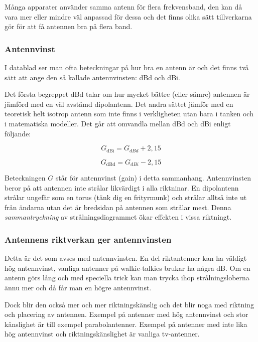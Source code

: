 Många apparater använder samma antenn för flera frekvensband, den kan då vara mer eller mindre väl anpassad för dessa och det finns olika sätt tillverkarna gör för att få antennen bra på flera band.

\subsubsection{Antennvinst}

I datablad ser man ofta beteckningar på hur bra en antenn är och det finns två sätt att ange den så kallade antennvinsten: dBd och dBi.

Det första begreppet dBd talar om hur mycket bättre (eller sämre) antennen är jämförd med en väl avstämd dipolantenn. Det andra sättet jämför med en teoretisk helt isotrop antenn som inte finns i verkligheten utan bara i tanken och i matematiska modeller. Det går att omvandla mellan dBd och dBi enligt följande:

\begin{equation}
G_{\mathrm{dBi}} = G_{dBd} + 2,15
\end{equation}

\begin{equation}
G_{\mathrm{dBd}} = G_{dBi} - 2,15
\end{equation}

Beteckningen $G$ står för antennvinst (gain) i detta sammanhang. Antennvinsten beror på att antennen inte strålar likvärdigt i alla riktninar. En dipolantenn strålar ungefär som en torus (tänk dig en frityrmunk) och strålar alltså inte ut från ändarna utan det är bredsidan på antennen som strålar mest. Denna \textit{sammantryckning} av strålningsdiagrammet ökar effekten i vissa riktningt.

\subsubsection{Antennens riktverkan ger antennvinsten}

Detta är det som avses med antennvinsten. En del riktantenner kan ha väldigt hög antennvinst, vanliga antenner på walkie-talkies brukar ha några dB. Om en antenn görs lång och med speciella trick kan man trycka ihop strålningsloberna ännu mer och då får man en högre antennvinst.

Dock blir den också mer och mer riktningskänslig och det blir noga med riktning och placering av antennen. Exempel på antenner med hög antennvinst och stor känslighet är till exempel parabolantenner. Exempel på antenner med inte lika hög antennvinst och riktningskänslighet är vanliga tv-antenner.

